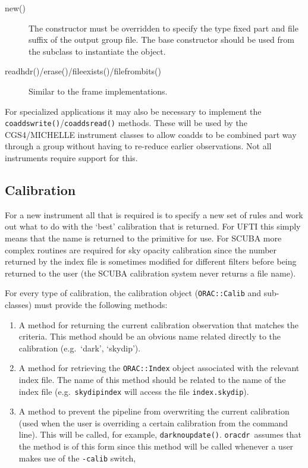 \documentclass[twoside,11pt]{article}
\renewcommand{\_}{\texttt{\symbol{95}}}
\newcommand{\oracdr}{\texttt{oracdr}}
\begin{document}
\begin{description}

\item[new()] \mbox{}

The constructor must be overridden to specify the type fixed part and
file suffix of the output group file. The base constructor should be
used from the subclass to instantiate the object.

\item[readhdr()/erase()/file\_exists()/file\_from\_bits()] \mbox{}

Similar to the frame implementations.


\end{description}

For specialized applications it may also be necessary to implement 
the \texttt{coaddswrite()}/\texttt{coaddsread()} methods. These will
be used by the CGS4/MICHELLE instrument classes to allow coadds to be 
combined part way through a group without having to re-reduce earlier
observations. Not all instruments require support for this.

\subsection{Calibration}\label{calibration_add}

For a new instrument all that is required is to specify a new
set of rules and work out what to do with the `best' calibration that
is returned. For UFTI this simply means that the name is returned to
the primitive for use. For SCUBA more complex routines are required
for sky opacity calibration since the number returned by the index
file is sometimes modified for different filters before being returned 
to the user (the SCUBA calibration system never returns a file name).

For every type of calibration, the calibration object
(\texttt{ORAC::Calib} and sub-classes) must provide the following methods:
\begin{enumerate}
\item A method for returning the current calibration observation that
matches the criteria. This method should be an obvious name related
directly to the calibration (e.g.\ `dark', `skydip').
\item A method for retrieving the \texttt{ORAC::Index} object
associated with the relevant index file. The name of this method
should be related to the name of the index file (e.g.\
\texttt{skydipindex} will access the file \texttt{index.skydip}).
\item A method to prevent the pipeline from overwriting the current
calibration (used when the user is overriding a certain calibration
from the command line). This will be called, for example,
\texttt{darknoupdate()}. \oracdr\ assumes that the method
is of this form since this method will be called whenever a user
makes use of the \texttt{-calib} switch,

\end{enumerate}
\end{document}
